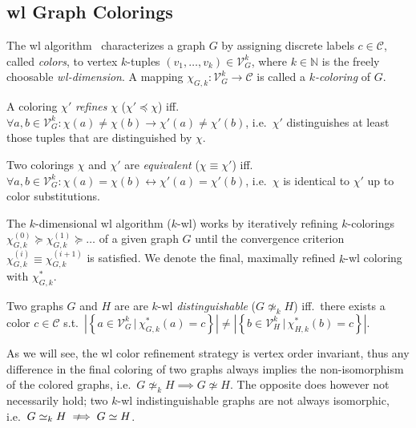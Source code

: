 \subsection{\acl{wl} Graph Colorings}%
\label{sec:related:character:wl}

The \acf{wl} algorithm~\cite{Weisfeiler1968}\cite{Cai1992} characterizes a graph $G$ by assigning discrete labels $c \in \mathcal{C}$, called \textit{colors}, to vertex $k$-tuples $(v_1, \dots, v_k) \in \mathcal{V}_G^k$, where $k \in \mathbb{N}$ is the freely choosable \textit{\ac{wl}-dimension}.
A mapping $\chi_{G, k}: \mathcal{V}_G^k \to \mathcal{C}$ is called a \textit{$k$-coloring} of $G$.
\begin{defn}
	A coloring $\chi'$ \textit{refines} $\chi$ ($\chi' \preceq \chi$) iff.\ $\forall a, b \in \mathcal{V}_G^k: \chi(a) \neq \chi(b) \rightarrow \chi'(a) \neq \chi'(b)$, i.e.\ $\chi'$ distinguishes at least those tuples that are distinguished by $\chi$.
\end{defn}
\begin{defn}
	Two colorings $\chi$ and $\chi'$ are \textit{equivalent} ($\chi \equiv \chi'$) iff.\ $\forall a, b \in \mathcal{V}_G^k: {\chi(a) = \chi(b)} \leftrightarrow {\chi'(a) = \chi'(b)}$, i.e.\ $\chi$ is identical to $\chi'$ up to color substitutions.
\end{defn}
The $k$-dimensional \ac{wl} algorithm ($k$-\acs{wl}) works by iteratively refining $k$-colorings $\chi_{G, k}^{(0)} \succeq \chi_{G, k}^{(1)} \succeq \dots$ of a given graph $G$ until the convergence criterion $\chi_{G, k}^{(i)} \equiv \chi_{G, k}^{(i+1)}$ is satisfied.
We denote the final, maximally refined $k$-\acs{wl} coloring with $\chi^{*}_{G, k}$.
\begin{defn}\label{defn:related:wl-distinguishable}
	Two graphs $G$ and $H$ are are $k$-\acs{wl} \textit{distinguishable} ($G \mathrel{{\not\simeq}_k} H$) iff.\ there exists a color $c \in \mathcal{C}$ s.t.\ $\left|\left\{ a \in \mathcal{V}_G^k\, |\, \chi^{*}_{G, k}(a) = c \right\}\right|\neq \left|\left\{ b \in \mathcal{V}_H^k\, |\, \chi^{*}_{H, k}(b) = c \right\}\right|$. %
\end{defn}
As we will see, the \ac{wl} color refinement strategy is vertex order invariant, thus any difference in the final coloring of two graphs always implies the non-isomorphism of the colored graphs, i.e.\ $G \mathrel{{\not\simeq}_k} H \implies G \not\simeq H$.
The opposite does however not necessarily hold;
two $k$-\acs{wl} indistinguishable graphs are not always isomorphic, i.e.\ $G \mathrel{{\simeq}_k} H \Longarrownot\implies G \simeq H$.

